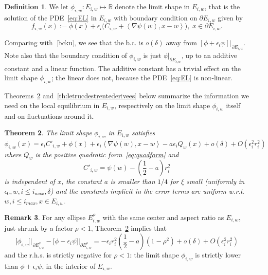 \documentclass[10pt]{amsart}
\newtheorem{theo}{Theorem}[section]
\theoremstyle{definition}\newtheorem{defi}[theo]{Definition}\newtheorem{rema}[theo]{Remark}\newtheorem{exam}[theo]{Example}\newtheorem{exem}[theo]{Example}\newtheorem{nota}[theo]{Notation}
\newcommand{\R}{\mathbb{R}}
\begin{document}
\begin{defi}\label{def:phiiw}
We let $\phi_{i,w}:E_{i,w}\mapsto \R$ denote the limit shape in $E_{i,w}$, that is the solution of the PDE~\eqref{eq:EL} in $E_{i,w}$ with boundary condition on $\partial E_{i,w}$ given by
\begin{equation}\label{eq:bcku1}
f_{i,w}(x):= \phi(x)+\epsilon_i\Big(C_{i,w}+ \left\langle \nabla\psi(w), x-w\right\rangle\Big),\;x\in \partial E_{i,w}.
\end{equation}
\end{defi}

Comparing with~\eqref{bcku}, we see that the b.c. is $o(\delta)$ away from $[\phi+\epsilon_i\psi]|_{\partial E_{i,w}}$. Note also that the boundary condition of $\phi_{i,w}$ is just $\phi|_{\partial E_{i,w}}$, up to an additive constant and a linear function. The additive constant has a trivial effect on the limit shape $\phi_{i,w}$; the linear does not, because the PDE~\eqref{eq:EL} is non-linear.

Theorems~\ref{thm:equilibrium_development} and~\ref{th:letrucdestrentederivees} below summarize the information we need on the local equilibrium in $E_{i,w}$, respectively on the limit shape $\phi_{i,w}$ itself and on fluctuations around it.



\begin{theo}\label{thm:equilibrium_development}
The limit shape $\phi_{i,w}$ in $E_{i,w}$ satisfies
\begin{equation}\label{eq:sa3}
\phi_{i,w}(x)=\epsilon_i C'_{i,w}+\phi(x)+\epsilon_i \left\langle \nabla\psi(w), x-w\right\rangle-a\epsilon_i Q_w(x) +o(\delta)+O\left(\epsilon_i^2 r_i^2\right)
\end{equation}
where $Q_w$ is the positive quadratic form~\eqref{eq:quadform} and
\begin{equation}\label{eq:C''}
C'_{i,w}=\psi(w)-\left(\frac12-a\right) r_i^2
\end{equation}
is independent of $x$, the constant $a$ is smaller than $1/4$ for $\xi$ small (uniformly in $\epsilon_0,w,i\le i_{max},\delta$) and the constants implicit in the error terms are uniform w.r.t. $w,i\le i_{max}, x\in E_{i,w}$.
\end{theo}

\begin{rema}
For any ellipse $E^\rho_{i,w}$ with the same center and aspect ratio as $E_{i,w}$, just shrunk by a factor $\rho<1$, Theorem~\ref{thm:equilibrium_development} implies that
\begin{equation}\label{eq:psinonpsi}
\big[\phi_{i,w}\big]\big|_{\partial E^\rho_{i,w}}- \big[\phi+\epsilon_i \psi\big]\big|_{\partial E^\rho_{i,w}}=-\epsilon_i r_i^2
\left(\frac12-a\right)\left(1-\rho^2\right)+o(\delta)+O\left(\epsilon_i^2r_i^2\right)
\end{equation}
and the r.h.s. is strictly negative for $\rho<1$: the limit shape $\phi_{i,w}$ is strictly lower than $\phi+\epsilon_i\psi$, in the interior of $E_{i,w}$.
\end{rema}
\end{document}
